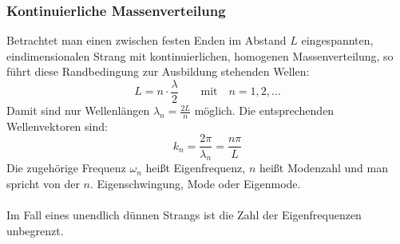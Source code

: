 \documentclass[a4paper,titlepage]{scrartcl}
\numberwithin{equation}{section}
\begin{document}
\subsubsection{Kontinuierliche Massenverteilung}
Betrachtet man einen zwischen festen Enden im Abstand $L$ eingespannten, eindimensionalen Strang mit kontinuierlichen, homogenen Massenverteilung, so führt diese Randbedingung zur Ausbildung stehenden Wellen:
\begin{equation}
\label{eq:stehendeWelleKontinuierlich}
L=n \cdot \frac{\lambda}{2} \quad \quad \text{mit} \quad n=1,2,...
\end{equation}
Damit sind nur Wellenlängen $\lambda_n=\frac{2L}{n}$ möglich. Die entsprechenden Wellenvektoren sind:
\begin{equation*}
k_n=\frac{2 \pi}{\lambda_n}=\frac{n \pi}{L}
\end{equation*}
Die zugehörige Frequenz $\omega_n$ heißt Eigenfrequenz, $n$ heißt Modenzahl und man spricht von der $n.$ Eigenschwingung, Mode oder Eigenmode.\\ \\
Im Fall eines unendlich dünnen Strangs ist die Zahl der Eigenfrequenzen unbegrenzt.
\end{document}
